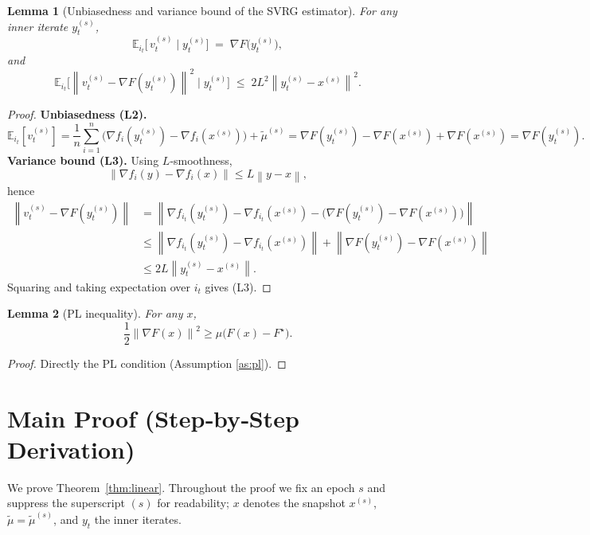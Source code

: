 \documentclass{article}
\newtheorem{lemma}{Lemma}
\newcommand{\EE}{\mathbb{E}}
\newcommand{\norm}[1]{\left\|#1\right\|}
\begin{document}
\begin{lemma}[Unbiasedness and variance bound of the SVRG estimator]\label{lem:unbiased}
For any inner iterate $y_t^{(s)}$,
\[
\EE_{i_t}\!\big[\,v_t^{(s)}\mid y_t^{(s)}\big]
   \;=\;\nabla F\!\big(y_t^{(s)}\big),
\tag{L2}
\]
and
\[
\EE_{i_t}\!\big[\norm{v_t^{(s)}-\nabla F(y_t^{(s)})}^{2}\mid y_t^{(s)}\big]
   \;\le\;2L^{2}\norm{y_t^{(s)}-x^{(s)}}^{2}.
\tag{L3}
\]
\end{lemma}
\begin{proof}
\textbf{Unbiasedness (L2).}
\[
\EE_{i_t}[v_t^{(s)}]
 =\frac1n\sum_{i=1}^{n}\Big(\nabla f_i(y_t^{(s)})-\nabla f_i(x^{(s)})\Big)+\tilde\mu^{(s)}
 =\nabla F(y_t^{(s)})-\nabla F(x^{(s)})+\nabla F(x^{(s)})=\nabla F(y_t^{(s)}).
\tag{[Step 1]}
\]
\textbf{Variance bound (L3).}
Using $L$‑smoothness,
\[
\norm{\nabla f_i(y)-\nabla f_i(x)}\le L\norm{y-x},
\]
hence
\[
\begin{aligned}
\norm{v_t^{(s)}-\nabla F(y_t^{(s)})}
&=\norm{\nabla f_{i_t}(y_t^{(s)})-\nabla f_{i_t}(x^{(s)})-\big(\nabla F(y_t^{(s)})-\nabla F(x^{(s)})\big)}\\
&\le \norm{\nabla f_{i_t}(y_t^{(s)})-\nabla f_{i_t}(x^{(s)})}
      +\norm{\nabla F(y_t^{(s)})-\nabla F(x^{(s)})}\\
&\le 2L\norm{y_t^{(s)}-x^{(s)}} .
\end{aligned}
\tag{[Step 2]}
\]
Squaring and taking expectation over $i_t$ gives (L3). \hfill\qedsymbol
\end{proof}

\begin{lemma}[PL inequality]\label{lem:pl}
For any $x$,
\[
\frac{1}{2}\norm{\nabla F(x)}^{2}\ge \mu\big(F(x)-F^\star\big).
\tag{L4}
\]
\end{lemma}
\begin{proof}
Directly the PL condition (Assumption \ref{as:pl}). \hfill\qedsymbol
\end{proof}

\section*{Main Proof (Step‑by‑Step Derivation)}
We prove Theorem~\ref{thm:linear}. Throughout the proof we fix an epoch $s$ and suppress the superscript $(s)$ for readability; $x$ denotes the snapshot $x^{(s)}$, $\tilde\mu=\tilde\mu^{(s)}$, and $y_t$ the inner iterates.
\end{document}
